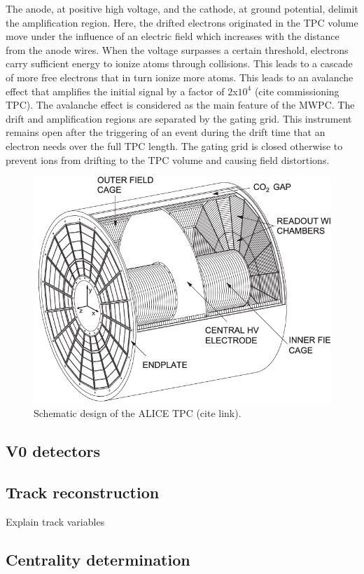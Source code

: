 \documentclass[12pt,a4paper]{report}
\begin{document}
The anode, at positive high voltage, and the cathode, at ground potential, delimit the amplification region. Here, the drifted electrons originated in the TPC volume move under the influence of an electric field which increases with the distance from the anode wires. When the voltage surpasses a certain threshold, electrons carry sufficient energy to ionize atoms through collisions. This leads to a cascade of more free electrons that in turn ionize more atoms. This leads to an avalanche effect that amplifies the initial signal by a factor of $2$x$10^4$ (cite commissioning TPC). The avalanche effect is considered as the main feature of the MWPC. The drift and amplification regions are separated by the gating grid. This instrument remains open after the triggering of an event during the drift time that an electron needs over the full TPC length. The gating grid is closed otherwise to prevent ions from drifting to the TPC volume and causing field distortions.
\begin{figure}[tb!]
\centering
\includegraphics[width=12cm]{Plots/ALICETPC.png}  
\caption{Schematic design of the ALICE TPC (cite link).}
\label{ALICETPC}
\end{figure}
\subsection{V0 detectors}

\subsection{Track reconstruction}
Explain track variables  %
\subsection{Centrality determination}
\end{document}

